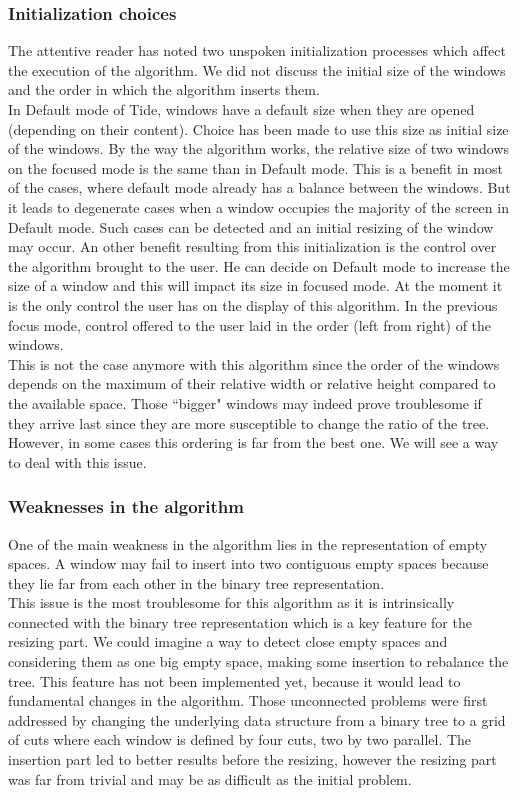 \documentclass{acmtog}
\begin{document}
\subsubsection{Initialization choices}

The attentive reader has noted two unspoken initialization processes which affect the execution of the algorithm. We did not discuss the initial size of the windows and the order in which the algorithm inserts them. \\
In Default mode of Tide, windows have a default size when they are opened (depending on their content). Choice has been made to use this size as initial size of the windows. By the way the algorithm works, the relative size of two windows on the focused mode is the same than in Default mode. This is a benefit in most of the cases, where default mode already has a balance between the windows. But it leads to degenerate cases when a window occupies the majority of the screen in Default mode. Such cases can be detected and an initial resizing of the window may occur. An other benefit resulting from this initialization is the control over the algorithm brought to the user. He can decide on Default mode to increase the size of a window and this will impact its size in focused mode. At the moment it is the only control the user has on the display of this algorithm. In the previous focus mode, control offered to the user laid in the order (left from right) of the windows. \\
This is not the case anymore with this algorithm since the order of the windows depends on the maximum of their relative width or relative height compared to the available space. Those ``bigger" windows may indeed prove troublesome if they arrive last since they are more susceptible to change the ratio of the tree. However, in some cases this ordering is far from the best one. We will see a way to deal with this issue.

\subsubsection{Weaknesses in the algorithm}

One of the main weakness in the algorithm lies in the representation of empty spaces. A window may fail to insert into two contiguous empty spaces because they lie far from each other in the binary tree representation. \\
This issue is the most troublesome for this algorithm as it is intrinsically connected with the binary tree representation which is a key feature for the resizing part. We could imagine a way to detect close empty spaces and considering them as one big empty space, making some insertion to rebalance the tree. This feature has not been implemented yet, because it would lead to fundamental changes in the algorithm. Those unconnected problems were first addressed by changing the underlying data structure from a binary tree to a grid of cuts where each window is defined by four cuts, two by two parallel. The insertion part led to better results before the resizing, however the resizing part was far from trivial and may be as difficult as the initial problem.
\end{document}
